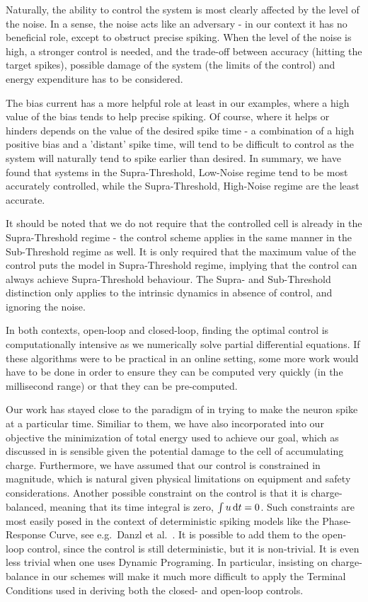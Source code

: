 Naturally, the ability to control the system is most clearly affected by the
level of the noise. In a sense, the noise acts like an adversary - in our
context it has no beneficial role, except to obstruct precise spiking.
When the level of the noise is high, a stronger control is needed, and
the trade-off between accuracy (hitting the target spikes), possible
damage of the system (the limits of the control) and energy expenditure
has to be considered.

The bias current has a more helpful role at least in our examples, where a
high value of the bias tends to help precise spiking. Of course, where it helps
or hinders depends on the value of the desired spike time - a combination of a
high positive bias and a 'distant' spike time, will tend to be difficult to
control as the system will naturally tend to spike earlier than desired.
In summary, we have found that systems in the Supra-Threshold, Low-Noise regime
tend to be most accurately controlled, while the Supra-Threshold, High-Noise
regime are the least accurate. 

It should be noted that we do not require that the controlled
cell is already in the Supra-Threshold regime - the control scheme
applies in the same manner in the Sub-Threshold regime as well. It is
only required that the maximum value of the control puts the 
model in Supra-Threshold regime, implying that the control can 
always achieve Supra-Threshold behaviour. The Supra- and Sub-Threshold
distinction only applies to the intrinsic dynamics in
absence of control, and ignoring the noise.

In both contexts, open-loop and closed-loop, finding the optimal control is
computationally intensive as we numerically solve partial differential
equations. If these algorithms were to be practical in an online setting, some
more work would have to be done in order to ensure they can be computed very
quickly (in the millisecond range) or that they can be pre-computed.

Our work has stayed close to the paradigm of \cite{Ahmadian2011} in
trying to make the neuron spike at a particular time. 
Similiar to them, we have also incorporated into our objective
the minimization of total energy used to achieve our goal, which as discussed in
\cite{Ahmadian2011} is sensible given the potential damage to the cell of
accumulating charge. Furthermore, we have assumed that our control is
constrained in magnitude, which is natural given physical limitations on
equipment and safety considerations. Another possible constraint on the control
is that it is charge-balanced, meaning that its time integral is zero, $\int u
\, \mathrm{d} t = 0$. Such constraints are most easily posed in the context of
deterministic spiking models like the Phase-Response Curve, see e.g.\ Danzl et
al.\ \cite{Danzl2010}. It is possible to add them to the open-loop control,
since the control is still deterministic, but it is non-trivial. It is even less
trivial when one uses Dynamic Programing. In
particular, insisting on charge-balance in our schemes will make it much more
difficult to apply the Terminal Conditions used in deriving both the closed- and
open-loop controls.

